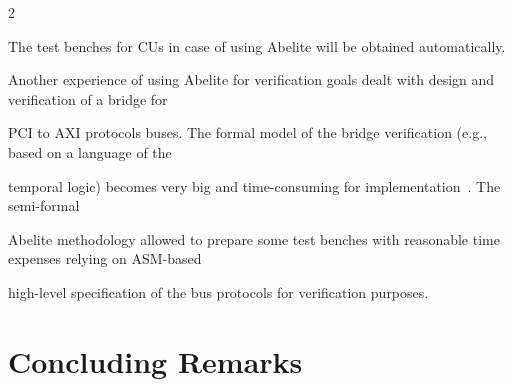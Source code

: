 \begin{multicols}{2}
\begin{figure}
\vspace*{-9pt}


\begin{minipage}[t]{79.5mm}




\end{minipage}


\hfill


\begin{minipage}[t]{79.5mm}




       \end{minipage}


       \end{figure}








  The test benches for CUs in case of using Abelite will be obtained automatically.





   Another experience of using Abelite for verification goals dealt with design and verification of a bridge for


PCI to AXI protocols buses. The formal model of the bridge verification (e.g., based on a language of the


temporal logic) becomes very big and time-consuming for implementation~\cite{27bar}. The semi-formal


Abelite methodology allowed to prepare some test benches with reasonable time expenses relying on ASM-based


high-level specification of the bus protocols for verification purposes.


{%





}





\vspace*{-9pt}





\section{Concluding Remarks} %






\end{multicols}
